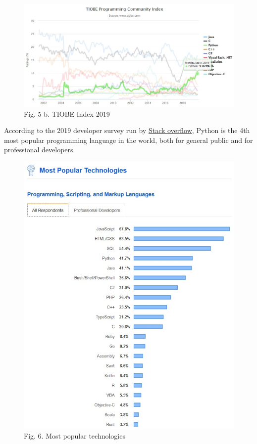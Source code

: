 \documentclass[11pt]{article}
\makeatletter
\def\maxwidth{\ifdim\Gin@nat@width>\linewidth\linewidth
    \else\Gin@nat@width\fi}
\let\Oldincludegraphics\includegraphics
\renewcommand{\includegraphics}[1]{\Oldincludegraphics[width=.8\maxwidth]{#1}}
\makeatother
\begin{document}
    \begin{figure}[H]
\centering
\includegraphics{figs/tiobepython.jpg}
\caption{Fig. 5 b. TIOBE Index 2019}
\end{figure}

    According to the 2019 developer survey run by
\href{https://insights.stackoverflow.com/survey/2019}{Stack overflow},
Python is the 4th most popular programming language in the world, both
for general public and for professional developers.

    \begin{figure}[H]
\centering
\includegraphics{figs/stackoverflowmostpopular.jpg}
\caption{Fig. 6. Most popular technologies}
\end{figure}
\end{document}
